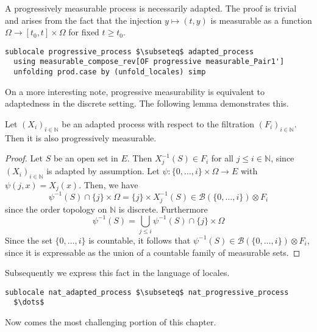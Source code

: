 A progressively measurable process is necessarily adapted. The proof is trivial and arises from the fact that the injection $y \mapsto (t, y)$ is measurable as a function $\Omega \rightarrow [t_0, t] \times \Omega$ for fixed $t \ge t_0$.

\begin{isalemma}
{\small
\begin{lstlisting}[style=isabelle]
sublocale progressive_process $\subseteq$ adapted_process 
  using measurable_compose_rev[OF progressive measurable_Pair1'] 
  unfolding prod.case by (unfold_locales) simp
\end{lstlisting}
}
\end{isalemma}

On a more interesting note, progressive measurability is equivalent to adaptedness in the discrete setting. The following lemma demonstrates this.

\begin{lemma}
	Let $(X_i)_{i \in \mathbb{N}}$ be an adapted process with respect to the filtration $(F_i)_{i \in \mathbb{N}}$. Then it is also progressively measurable.
\end{lemma}
\begin{proof}
	Let $S$ be an open set in $E$. Then $X_j^{-1}(S) \in F_i$ for all $j \le i \in \mathbb{N}$, since $(X_i)_{i \in \mathbb{N}}$ is adapted by assumption. Let $\psi : \{0,\dots,i\} \times \Omega \rightarrow E$ with $\psi(j,x) = X_j(x)$. Then, we have
	\[
		\psi^{-1}(S) \cap \{j\} \times \Omega = \{j\} \times X_j^{-1}(S) \in \mathcal{B}(\{0,\dots,i\}) \otimes F_i
	\]
	since the order topology on $\mathbb{N}$ is discrete. Furthermore
	\[
		\psi^{-1}(S) = \bigcup_{j \le i} \psi^{-1}(S) \cap \{j\} \times \Omega 
	\]
	Since the set $\{0,\dots,i\}$ is countable, it follows that $\psi^{-1}(S) \in \mathcal{B}(\{0,\dots,i\}) \otimes F_i$, since it is expressable as the union of a countable family of measurable sets.
\end{proof}

Subsequently we express this fact in the language of locales.

\begin{isalemma}
{\small
\begin{lstlisting}[style=isabelle]
sublocale nat_adapted_process $\subseteq$ nat_progressive_process
  $\dots$
\end{lstlisting}
}
\end{isalemma}

Now comes the most challenging portion of this chapter.

